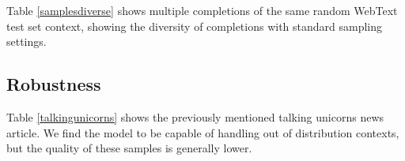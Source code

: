 \documentclass{article}
\begin{document}
Table \ref{samplesdiverse} shows multiple completions of the same random WebText test set context, showing the diversity of completions with standard sampling settings.

\subsection{Robustness}

Table \ref{talkingunicorns} shows the previously mentioned talking unicorns news article. We find the model to be capable of handling out of distribution contexts, but the quality of these samples is generally lower.




\end{document}
